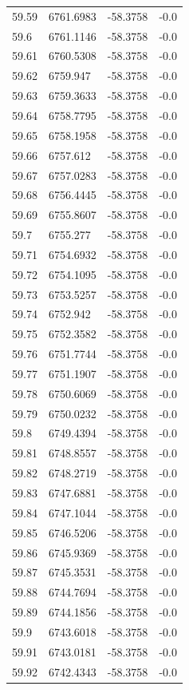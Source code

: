 \begin{table}[H]
\begin{tabular}{llll}
59.59 & 6761.6983 & -58.3758 & -0.0 \\
59.6 & 6761.1146 & -58.3758 & -0.0 \\
59.61 & 6760.5308 & -58.3758 & -0.0 \\
59.62 & 6759.947 & -58.3758 & -0.0 \\
59.63 & 6759.3633 & -58.3758 & -0.0 \\
59.64 & 6758.7795 & -58.3758 & -0.0 \\
59.65 & 6758.1958 & -58.3758 & -0.0 \\
59.66 & 6757.612 & -58.3758 & -0.0 \\
59.67 & 6757.0283 & -58.3758 & -0.0 \\
59.68 & 6756.4445 & -58.3758 & -0.0 \\
59.69 & 6755.8607 & -58.3758 & -0.0 \\
59.7 & 6755.277 & -58.3758 & -0.0 \\
59.71 & 6754.6932 & -58.3758 & -0.0 \\
59.72 & 6754.1095 & -58.3758 & -0.0 \\
59.73 & 6753.5257 & -58.3758 & -0.0 \\
59.74 & 6752.942 & -58.3758 & -0.0 \\
59.75 & 6752.3582 & -58.3758 & -0.0 \\
59.76 & 6751.7744 & -58.3758 & -0.0 \\
59.77 & 6751.1907 & -58.3758 & -0.0 \\
59.78 & 6750.6069 & -58.3758 & -0.0 \\
59.79 & 6750.0232 & -58.3758 & -0.0 \\
59.8 & 6749.4394 & -58.3758 & -0.0 \\
59.81 & 6748.8557 & -58.3758 & -0.0 \\
59.82 & 6748.2719 & -58.3758 & -0.0 \\
59.83 & 6747.6881 & -58.3758 & -0.0 \\
59.84 & 6747.1044 & -58.3758 & -0.0 \\
59.85 & 6746.5206 & -58.3758 & -0.0 \\
59.86 & 6745.9369 & -58.3758 & -0.0 \\
59.87 & 6745.3531 & -58.3758 & -0.0 \\
59.88 & 6744.7694 & -58.3758 & -0.0 \\
59.89 & 6744.1856 & -58.3758 & -0.0 \\
59.9 & 6743.6018 & -58.3758 & -0.0 \\
59.91 & 6743.0181 & -58.3758 & -0.0 \\
59.92 & 6742.4343 & -58.3758 & -0.0 \\

\end{tabular}
\end{table}
